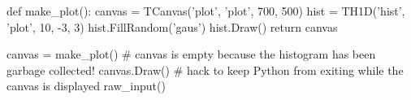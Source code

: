 \begin{footnotesize}
\begin{pyglist}[language=python,texcl=true,abovecaptionskip=0,style=vs,bgcolor=Moccasin]

def make_plot():
    canvas = TCanvas('plot', 'plot', 700, 500)
    hist = TH1D('hist', 'plot', 10, -3, 3)
    hist.FillRandom('gaus')
    hist.Draw()
    return canvas

canvas = make_plot()
# canvas is empty because the histogram has been garbage collected!
canvas.Draw()
# hack to keep Python from exiting while the canvas is displayed
raw_input()
\end{pyglist}
\end{footnotesize}

